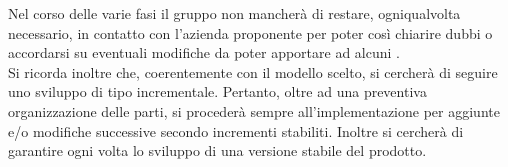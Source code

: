 Nel corso delle varie fasi il gruppo non mancherà di restare, ogniqualvolta necessario, in contatto con l'azienda proponente \proponente{} per poter così chiarire dubbi o accordarsi su eventuali modifiche da poter apportare ad alcuni .\\
Si ricorda inoltre che, coerentemente con il modello scelto, si cercherà di seguire uno sviluppo di tipo incrementale. Pertanto, oltre ad una preventiva organizzazione delle parti, si procederà sempre all'implementazione per aggiunte e/o modifiche successive secondo incrementi stabiliti. Inoltre si cercherà di garantire ogni volta lo sviluppo di una versione stabile del prodotto.